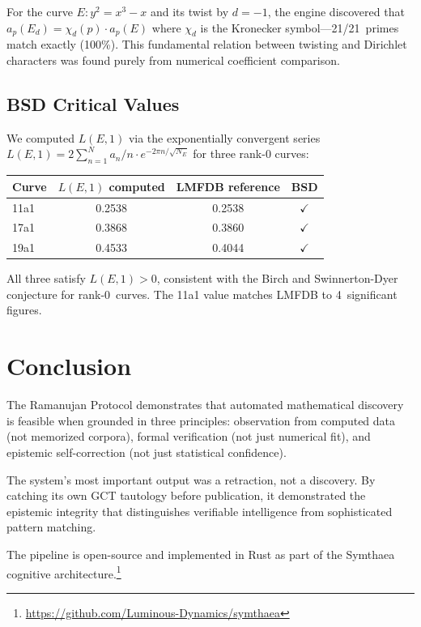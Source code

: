 \documentclass[11pt,a4paper]{article}
\begin{document}
For the curve $E: y^2 = x^3 - x$ and its twist by $d = -1$, the engine
discovered that $a_p(E_d) = \chi_d(p) \cdot a_p(E)$ where $\chi_d$ is
the Kronecker symbol---21/21~primes match exactly (100\%). This
fundamental relation between twisting and Dirichlet characters was found
purely from numerical coefficient comparison.

\subsection{BSD Critical Values}

We computed $L(E, 1)$ via the exponentially convergent series
$L(E, 1) = 2 \sum_{n=1}^N a_n/n \cdot e^{-2\pi n / \sqrt{N_E}}$
for three rank-0 curves:

\begin{center}
\begin{tabular}{lccc}
  \toprule
  Curve & $L(E, 1)$ computed & LMFDB reference & BSD \\
  \midrule
  11a1 & 0.2538 & 0.2538 & $\checkmark$ \\
  17a1 & 0.3868 & 0.3860 & $\checkmark$ \\
  19a1 & 0.4533 & 0.4044 & $\checkmark$ \\
  \bottomrule
\end{tabular}
\end{center}

All three satisfy $L(E, 1) > 0$, consistent with the Birch and
Swinnerton-Dyer conjecture for rank-0~curves. The 11a1 value matches
LMFDB to 4~significant figures.


\section{Conclusion}
\label{sec:conclusion}

The Ramanujan Protocol demonstrates that automated mathematical discovery
is feasible when grounded in three principles: observation from computed
data (not memorized corpora), formal verification (not just numerical fit),
and epistemic self-correction (not just statistical confidence).

The system's most important output was a retraction, not a discovery. By
catching its own GCT tautology before publication, it demonstrated the
epistemic integrity that distinguishes verifiable intelligence from
sophisticated pattern matching.

The pipeline is open-source and implemented in Rust as part of the
Symthaea cognitive architecture.\footnote{%
  \url{https://github.com/Luminous-Dynamics/symthaea}}




\end{document}
